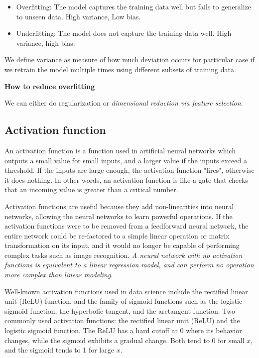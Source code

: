 \documentclass[11pt]{article}
\begin{document}
\begin{itemize} 
\item Overfitting: The model captures the training data well but fails to generalize to unseen data. High variance, Low bias. 
\item Underfitting: The model does not capture the training data well. High variance, high bias. 
\end{itemize} 


We define variance as measure of how much deviation occurs for particular case if we retrain the model
multiple times using different subsets of training data. 

\textbf{How to reduce overfitting}

We can either do regularization or \emph{dimensional reduction via feature selection}. 


\subsection{Activation function} 

An activation function is a function used in artificial neural networks which outputs a small value for small inputs, and a larger value if the 
inputs exceed a threshold. If the inputs are large enough, the activation function "fires", 
otherwise it does nothing. In other words, an activation function is like a gate 
that checks that an incoming value is greater than a critical number.

Activation functions are useful because they add non-linearities into neural networks, 
allowing the neural networks to learn powerful operations. 
If the activation functions were to be removed from a feedforward neural network, 
the entire network could be re-factored to a simple linear operation or matrix transformation on its input, 
and it would no longer be capable of performing complex tasks such as image recognition.
\emph{A neural network with no activation functions is equivalent to a linear regression model, and can perform no operation more complex than linear modeling}.

Well-known activation functions used in data science include the rectified linear unit (ReLU) function, 
and the family of sigmoid functions such as the logistic sigmoid function, 
the hyperbolic tangent, and the arctangent function.
Two commonly used activation functions: the rectified linear unit (ReLU) and the logistic sigmoid function. The ReLU has a hard cutoff at 0 where 
its behavior changes, while the sigmoid exhibits a gradual change. Both tend to 0 for small $x$, and the sigmoid tends to 1 for large $x$.
\end{document}
